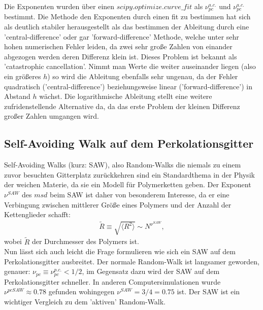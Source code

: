\documentclass[a4paper, 12pt]{scrartcl}
\begin{document}
\vspace{0,5cm}
\newpage
\noindent Die Exponenten wurden über einen $scipy.optimize.curve\_fit$ als $\nu_{pc}^{a.c.}$ und $\nu_{pc}^{a.c.}$ bestimmt. Die Methode den Exponenten durch einen fit zu bestimmen hat sich als deutlich stabiler herausgestellt als das bestimmen der Ableitung durch eine 'central-difference' oder gar 'forward-difference' Methode, welche unter sehr hohen numerischen Fehler leiden, da zwei sehr große Zahlen von einander abgezogen werden deren Differenz klein ist. Dieses Problem ist bekannt als 'catastrophic cancellation'. Nimmt man Werte die weiter auseinander liegen (also ein größeres $h$) so wird die Ableitung ebenfalls sehr ungenau, da der Fehler quadratisch ('central-difference') beziehungsweise linear ('forward-difference') in Abstand $h$ wächst. Die logarithmische Ableitung stellt eine weitere zufridenstellende Alternative da, da das erste Problem der kleinen Differenz großer Zahlen umgangen wird. 

\subsection{Self-Avoiding Walk auf dem Perkolationsgitter}
Self-Avoiding Walks (kurz: SAW), also Random-Walks die niemals zu einem zuvor besuchten Gitterplatz zurückkehren sind ein Standardthema in der Physik der weichen Materie, da sie ein Modell für Polymerketten geben. Der Exponent $\nu^{SAW}$ des $msd$ beim SAW ist daher von besonderem Interesse, da er eine Verbingung zwischen mittlerer Größe eines Polymers und der Anzahl der Kettenglieder schafft:
\begin{align*}
\tilde R \equiv \sqrt{\langle R^2 \rangle} \sim N^{\nu^{SAW}},
\end{align*} 
wobei $\tilde R$ der Durchmesser des Polymers ist.
\\
Nun lässt sich auch leicht die Frage formulieren wie sich ein SAW auf dem Perkolationsgitter ausbreitet. Der normale Random-Walk ist langsamer geworden, genauer: $\nu_{pc} \equiv \nu_{pc}^{p.c.} < 1/2$, im Gegensatz dazu wird der SAW auf dem Perkolationsgitter schneller. In anderen Computersimulationen wurde $\nu^{pcSAW} \approx 0.78$ gefunden wohingegen $\nu^{SAW}=3/4=0.75$ ist. Der SAW ist ein wichtiger Vergleich zu dem 'aktiven' Random-Walk.
\end{document}
